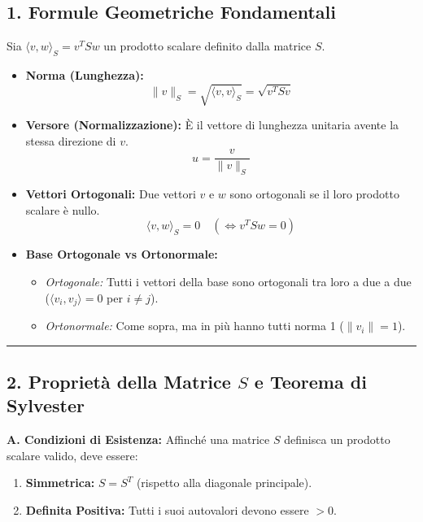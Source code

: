 \documentclass[10pt,a4paper]{article}
\begin{document}
\begin{tcolorbox}[colback=cyan!5!white,colframe=cyan!75!black,title=\textbf{FORMULARIO}]

\subsection*{1. Formule Geometriche Fondamentali}
Sia $\langle v, w \rangle_S = v^T S w$ un prodotto scalare definito dalla matrice $S$.

\begin{itemize}
    \item \textbf{Norma (Lunghezza):}
    \[ \|v\|_S = \sqrt{\langle v, v \rangle_S} = \sqrt{v^T S v} \]
    
    \item \textbf{Versore (Normalizzazione):}
    È il vettore di lunghezza unitaria avente la stessa direzione di $v$.
    \[ u = \frac{v}{\|v\|_S} \]
    
    \item \textbf{Vettori Ortogonali:}
    Due vettori $v$ e $w$ sono ortogonali se il loro prodotto scalare è nullo.
    \[ \langle v, w \rangle_S = 0 \quad (\iff v^T S w = 0) \]
    
    \item \textbf{Base Ortogonale vs Ortonormale:}
    \begin{itemize}
        \item \textit{Ortogonale:} Tutti i vettori della base sono ortogonali tra loro a due a due ($\langle v_i, v_j \rangle = 0$ per $i \neq j$).
        \item \textit{Ortonormale:} Come sopra, ma in più hanno tutti norma 1 ($\|v_i\| = 1$).
    \end{itemize}
\end{itemize}

\hrule
\vspace{0.3cm}

\subsection*{2. Proprietà della Matrice $S$ e Teorema di Sylvester}

\textbf{A. Condizioni di Esistenza:}
Affinché una matrice $S$ definisca un prodotto scalare valido, deve essere:
\begin{enumerate}
    \item \textbf{Simmetrica:} $S = S^T$ (rispetto alla diagonale principale).
    \item \textbf{Definita Positiva:} Tutti i suoi autovalori devono essere $>0$.
\end{enumerate}


\end{tcolorbox}
\end{document}
